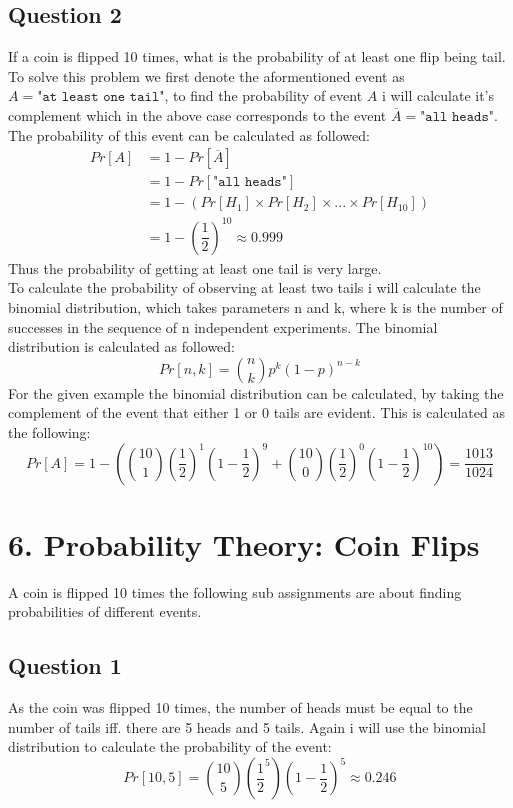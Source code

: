 \documentclass{article}
\begin{document}
\subsection{Question 2}
If a coin is flipped 10 times, what is the probability of at least one flip being tail. To solve this problem we first denote the aformentioned event as $A = \texttt{"at least one tail"}$, to find the probability of event $A$ i will calculate it's complement which in the above case corresponds to the event $\overline{A} = \texttt{"all heads"}$. The probability of this event can be calculated as followed:
\begin{align}
Pr[A] &= 1-Pr[\overline{A}] \\
&= 1-Pr[\texttt{"all heads"}] \\
&= 1 - \left( Pr[H_1] \times Pr[H_2] \times ... \times Pr[H_{10}] \right) \\
&= 1 - \left( \dfrac{1}{2} \right)^{10} \approx 0.999
\end{align}
Thus the probability of getting at least one tail is very large. \\
To calculate the probability of observing at least two tails i will calculate the binomial distribution, which takes parameters n and k, where k is the number of successes in the sequence of n independent experiments. The binomial distribution is calculated as followed:
$$
Pr[n,k] = \binom{n}{k}p^k(1-p)^{n-k}
$$
For the given example the binomial distribution can be calculated, by taking the complement of the event that either 1 or 0 tails are evident. This is calculated as the following:
$$
Pr[A] = 1 - \left( \binom{10}{1} \left(\frac{1}{2}\right)^1\left(1-\frac{1}{2}\right)^9 +
 \binom{10}{0} \left(\frac{1}{2}\right)^0\left(1-\frac{1}{2}\right)^{10} \right)
= \frac{1013}{1024}
$$
\section{6. Probability Theory: Coin Flips}
A coin is flipped 10 times the following sub assignments are about finding probabilities of different events.
\subsection{Question 1}
As the coin was flipped 10 times, the number of heads must be equal to the number of tails iff. there are 5 heads and 5 tails. Again i will use the binomial distribution to calculate the probability of the event:
$$
Pr[10,5] = \binom{10}{5} \left(\dfrac{1}{2}^5\right)\left(1-\dfrac{1}{2}\right)^5
\approx 0.246
$$
\end{document}

